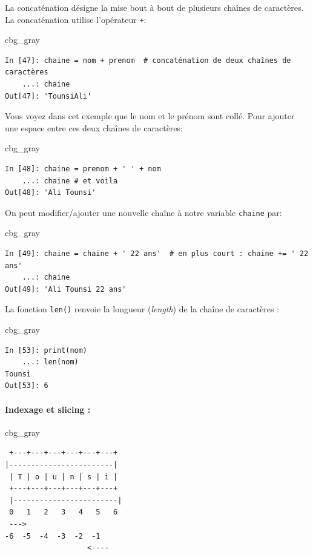 \documentclass[%
oneside,                 %
final,                   %
10pt]{article}
\newenvironment{_cod_tight}[1]{
   \def\FrameCommand{\colorbox{#1}}
   \FrameRule0.6pt\MakeFramed {\FrameRestore}\vskip3mm}
   {\vskip0mm\endMakeFramed}
\newenvironment{cod}[1]{
\bgroup\rmfamily
\fboxsep=0mm\relax
\begin{_cod_tight}{#1}
\list{}{\parsep=-2mm\parskip=0mm\topsep=0pt\leftmargin=2mm
\rightmargin=2\leftmargin\leftmargin=4pt\relax}
\item\relax}
{\endlist\end{_cod_tight}\egroup}
\begin{document}
La concaténation désigne la mise bout à bout de plusieurs chaînes de caractères.
La concaténation utilise l'opérateur \texttt{+}:
\begin{cod}{cbg_gray}\begin{verbatim}
In [47]: chaine = nom + prenom  # concaténation de deux chaînes de caractères
    ...: chaine
Out[47]: 'TounsiAli'
\end{verbatim}
\end{cod}
\noindent
Vous voyez dans cet exemple que le nom et le prénom sont collé. Pour ajouter une espace entre ces deux chaînes de caractères:
\begin{cod}{cbg_gray}\begin{verbatim}
In [48]: chaine = prenom + ' ' + nom
    ...: chaine # et voila
Out[48]: 'Ali Tounsi'
\end{verbatim}
\end{cod}
\noindent
On peut modifier/ajouter une nouvelle chaîne à notre variable \texttt{chaine} par:
\begin{cod}{cbg_gray}\begin{verbatim}
In [49]: chaine = chaine + ' 22 ans'  # en plus court : chaine += ' 22 ans'
    ...: chaine
Out[49]: 'Ali Tounsi 22 ans'
\end{verbatim}
\end{cod}
\noindent

La fonction \texttt{len()} renvoie la longueur (\emph{length}) de la chaîne de caractères :

\begin{cod}{cbg_gray}\begin{verbatim}
In [53]: print(nom)
    ...: len(nom)
Tounsi
Out[53]: 6
\end{verbatim}
\end{cod}
\noindent

\paragraph{Indexage et slicing :}

\begin{cod}{cbg_gray}\begin{verbatim}
 +---+---+---+---+---+---+
|------------------------|
 | T | o | u | n | s | i |
 +---+---+---+---+---+---+
 |------------------------|
 0   1   2   3   4   5   6
 --->
-6  -5  -4  -3  -2  -1
                   <----
\end{verbatim}
\end{cod}
\noindent
\end{document}
